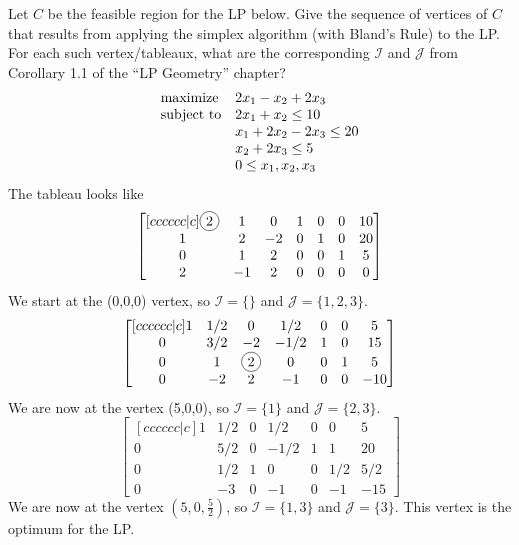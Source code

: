 \documentclass[12pt]{article}
\newcommand*\circled[1]{\tikz[baseline=(char.base)]{
		\node[shape=circle,draw,inner sep=2pt] (char) {#1};}}
\newenvironment{exercise}[2][Exercise]{\begin{trivlist}
\item[\hskip \labelsep {\bfseries #1}\hskip \labelsep {\bfseries #2.}]}{\end{trivlist}}
\begin{document}
\begin{exercise}{5} Let $C$ be the feasible region for the LP below.  Give the sequence of vertices of $C$ that results from applying the simplex algorithm (with Bland's Rule) to the LP.  For each such vertex/tableaux, what are the corresponding $\mathcal{I}$ and $\mathcal{J}$ from Corollary 1.1 of the ``LP Geometry'' chapter?
\begin{equation*}
\begin{array}{ll@{}ll}
\text{maximize}  & \displaystyle 2x_1 - x_2 + 2x_3 &\\
\text{subject to}& \displaystyle 2x_1 + x_2 \leq 10   \\
                 & \displaystyle x_1 + 2x_2 - 2x_3 \leq 20 \\
                 & \displaystyle x_2 + 2x_3 \leq 5 \\
                 & \displaystyle 0 \leq x_1,x_2,x_3
\end{array}
\end{equation*}
 The tableau looks like
\[\begin{bmatrix}[cccccc|c]
	\circled{2} &  1 &  0 & 1 & 0 & 0 & 10\\
	1 &  2 & -2 & 0 & 1 & 0 & 20\\
	0 &  1 &  2 & 0 & 0 & 1 & 5\\
	2 & -1 &  2 & 0 & 0 & 0 & 0
\end{bmatrix}\]
We start at the (0,0,0) vertex, so $\mathcal{I} = \{\}$ and $\mathcal{J} = \{1,2,3\}$.
\[\begin{bmatrix}[cccccc|c]
	1 &  1/2 &  0 & 1/2 & 0 & 0 & 5\\
	0 &  3/2 & -2 & -1/2 & 1 & 0 & 15\\
	0 &  1 &  \circled{2} & 0 & 0 & 1 & 5\\
	0 & -2 &  2 & -1 & 0 & 0 & -10
\end{bmatrix}\]
We are now at the vertex (5,0,0), so $\mathcal{I} = \{1\}$ and $\mathcal{J} = \{2,3\}$.
\[\begin{bmatrix}[cccccc|c]
	1 &  1/2 &  0 &  1/2 & 0 & 0 & 5\\
	0 &  5/2 &  0 & -1/2 & 1 & 1 & 20\\
	0 &  1/2 &  1 &   0  & 0 & 1/2 & 5/2\\
	0 &  -3  &  0 &  -1  & 0 & -1 & -15
\end{bmatrix}\]
We are now at the vertex $(5,0,\frac{5}{2})$, so $\mathcal{I} = \{1,3\}$ and $\mathcal{J} = \{3\}$. This vertex is the optimum for the LP.


\end{exercise}


 
\end{document}
